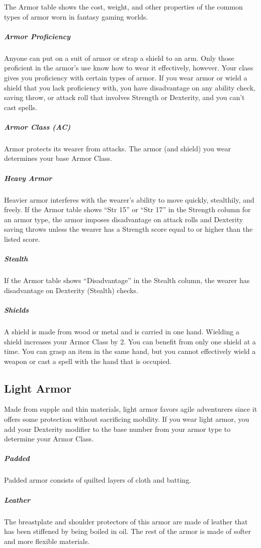 The Armor table shows the cost, weight, and other properties of the common types of armor worn in fantasy gaming worlds.

\subparagraph*{Armor Proficiency} Anyone can put on a suit of armor or strap a shield to an arm. Only those proficient in the armor's use know how to wear it effectively, however. Your class gives you proficiency with certain types of armor. If you wear armor or wield a shield that you lack proficiency with, you have disadvantage on any ability check, saving throw, or attack roll that involves Strength or Dexterity, and you can't cast spells.

\subparagraph*{Armor Class (AC)} Armor protects its wearer from attacks. The armor (and shield) you wear determines your base Armor Class.

\subparagraph*{Heavy Armor} Heavier armor interferes with the wearer's ability to move quickly, stealthily, and freely. If the Armor table shows “Str 15” or “Str 17” in the Strength column for an armor type, the armor imposes disadvantage on attack rolls and Dexterity saving throws unless the wearer has a Strength score equal to or higher than the listed score.

\subparagraph*{Stealth} If the Armor table shows “Disadvantage” in the Stealth column, the wearer has disadvantage on Dexterity (Stealth) checks.

\subparagraph*{Shields} A shield is made from wood or metal and is carried in one hand. Wielding a shield increases your Armor Class by 2. You can benefit from only one shield at a time. You can grasp an item in the same hand, but you cannot effectively wield a weapon or cast a spell with the hand that is occupied.

\subsection{Light Armor}

Made from supple and thin materials, light armor favors agile adventurers since it offers some protection without sacrificing mobility. If you wear light armor, you add your Dexterity modifier to the base number from your armor type to determine your Armor Class.

\subparagraph*{Padded} Padded armor consists of quilted layers of cloth and batting.

\subparagraph*{Leather} The breastplate and shoulder protectors of this armor are made of leather that has been stiffened by being boiled in oil. The rest of the armor is made of softer and more flexible materials.

